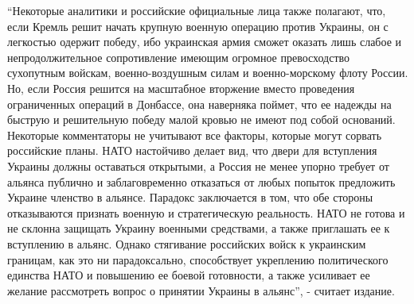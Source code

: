 \begin{multicols}{3}
\enquote{Некоторые аналитики и российские официальные лица также полагают, что, если
Кремль решит начать крупную военную операцию против Украины, он с легкостью
одержит победу, ибо украинская армия сможет оказать лишь слабое и
непродолжительное сопротивление имеющим огромное превосходство сухопутным
войскам, военно-воздушным силам и военно-морскому флоту России. Но, если Россия
решится на масштабное вторжение вместо проведения ограниченных операций в
Донбассе, она наверняка поймет, что ее надежды на быструю и решительную победу
малой кровью не имеют под собой оснований. Некоторые комментаторы не учитывают
все факторы, которые могут сорвать российские планы. НАТО настойчиво делает
вид, что двери для вступления Украины должны оставаться открытыми, а Россия не
менее упорно требует от альянса публично и заблаговременно отказаться от любых
попыток предложить Украине членство в альянсе. Парадокс заключается в том, что
обе стороны отказываются признать военную и стратегическую реальность. НАТО не
готова и не склонна защищать Украину военными средствами, а также приглашать ее
к вступлению в альянс. Однако стягивание российских войск к украинским
границам, как это ни парадоксально, способствует укреплению политического
единства НАТО и повышению ее боевой готовности, а также усиливает ее желание
рассмотреть вопрос о принятии Украины в альянс}, - считает издание.


\end{multicols} %
